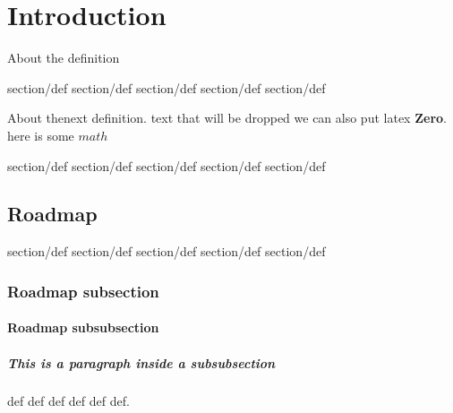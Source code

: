 \chapter{Introduction}
\label{ch:intro}

About the definition

\begin{definition}


section/def section/def section/def
section/def section/def
\end{definition}


About thenext definition.
text that will be dropped we can also put latex  \textbf{Zero}.
here is some $math$

\begin{definition}
section/def section/def section/def
section/def section/def
\end{definition}



\section{Roadmap}
\label{sec:roadmap}



\begin{definition}
\label{def:one}
section/def section/def section/def
section/def section/def
\end{definition}



\subsection{Roadmap subsection}

\subsubsection{Roadmap subsubsection}
\paragraph{This is a paragraph inside a subsubsection}

\begin{definition}
\label{def:title}
  def def def
  def
  def def.
\end{definition}


